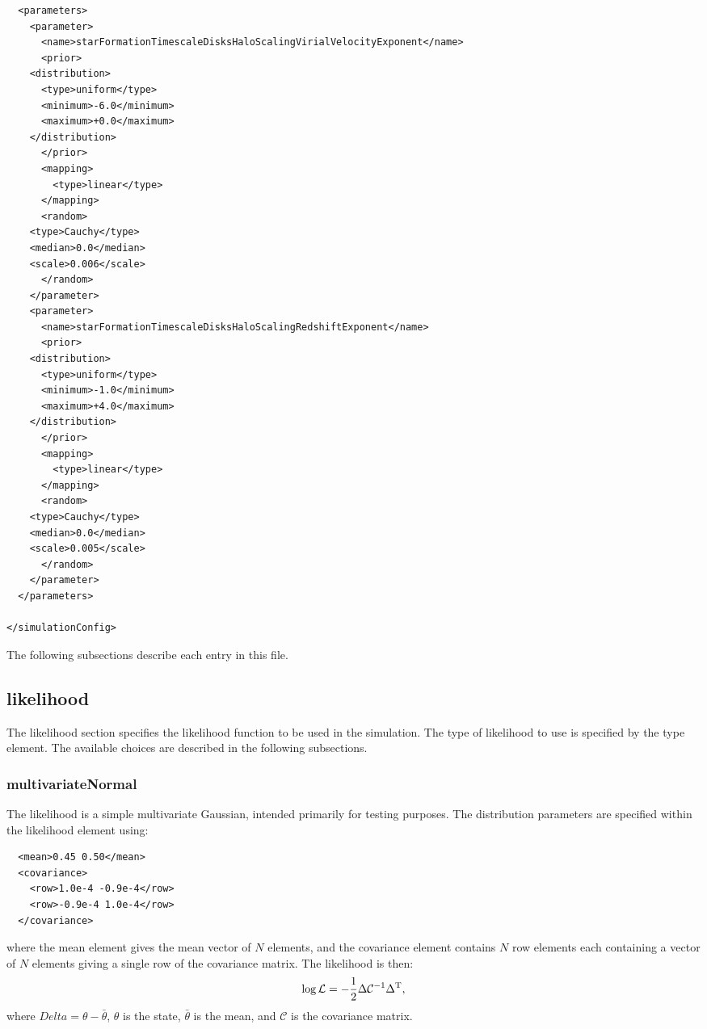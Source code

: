 \begin{verbatim}
  <parameters>
    <parameter>
      <name>starFormationTimescaleDisksHaloScalingVirialVelocityExponent</name>
      <prior>
	<distribution>
	  <type>uniform</type>
	  <minimum>-6.0</minimum>
	  <maximum>+0.0</maximum>
	</distribution>
      </prior>
      <mapping>
        <type>linear</type>
      </mapping>
      <random>
	<type>Cauchy</type>
	<median>0.0</median>
	<scale>0.006</scale>
      </random>
    </parameter>
    <parameter>
      <name>starFormationTimescaleDisksHaloScalingRedshiftExponent</name>
      <prior>
	<distribution>
	  <type>uniform</type>
	  <minimum>-1.0</minimum>
	  <maximum>+4.0</maximum>
	</distribution> 
      </prior>
      <mapping>
        <type>linear</type>
      </mapping>
      <random>
	<type>Cauchy</type>
	<median>0.0</median>
	<scale>0.005</scale>
      </random>
    </parameter>
  </parameters>
  
</simulationConfig>
\end{verbatim}

The following subsections describe each entry in this file.

\subsection{{\normalfont \ttfamily likelihood}}

The {\normalfont \ttfamily likelihood} section specifies the likelihood function to be used in the simulation. The type of likelihood to use is specified by the {\normalfont \ttfamily type} element. The available choices are described in the following subsections.

\subsubsection{multivariateNormal}

The likelihood is a simple multivariate Gaussian, intended primarily for testing purposes. The distribution parameters are specified within the {\normalfont \ttfamily likelihood} element using:
\begin{verbatim}
  <mean>0.45 0.50</mean>
  <covariance>
    <row>1.0e-4 -0.9e-4</row>
    <row>-0.9e-4 1.0e-4</row>
  </covariance>
\end{verbatim}
where the {\normalfont \ttfamily mean} element gives the mean vector of $N$ elements, and the {\normalfont \ttfamily covariance} element contains $N$ {\normalfont \ttfamily row} elements each containing a vector of $N$ elements giving a single row of the covariance matrix. The likelihood is then:
\begin{equation}
\log \mathcal{L} = - {1 \over 2} \Delta \mathcal{C}^{-1} \Delta^\mathrm{T},
\end{equation}
where $Delta = \theta - \bar{\theta}$, $\theta$ is the state, $\bar{\theta}$ is the mean, and $\mathcal{C}$ is the covariance matrix.

